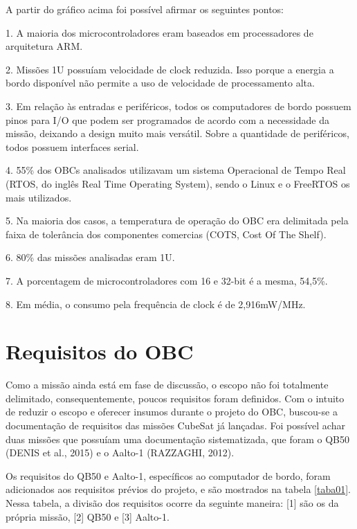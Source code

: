 \begin{apendicesenv}
A partir do gráfico acima foi possível afirmar os seguintes pontos:

1. A maioria dos microcontroladores eram baseados em processadores de arquitetura ARM.

2. Missões 1U possuíam velocidade de clock reduzida. Isso porque a energia a bordo disponível não permite a uso de velocidade de processamento alta.

3. Em relação às entradas e periféricos, todos os computadores de bordo possuem pinos para I/O que podem ser programados de acordo com a necessidade da missão, deixando a design muito mais versátil. Sobre a quantidade de periféricos, todos possuem interfaces serial.

4. 55\% dos OBCs analisados utilizavam um sistema Operacional de Tempo Real (RTOS, do inglês Real Time Operating System), sendo o Linux e o FreeRTOS os mais utilizados. 

5. Na maioria dos casos, a temperatura de operação do OBC era delimitada pela faixa de tolerância dos componentes comercias (COTS, Cost Of The Shelf). 

6. 80\% das missões analisadas eram 1U.

7. A porcentagem de microcontroladores com 16 e 32-bit é a mesma, 54,5\%.

8. Em média, o consumo pela frequência de clock é de 2,916mW/MHz.





\chapter{Requisitos do OBC}
\label{apendiceb}


Como a missão ainda está em fase de discussão, o escopo não foi totalmente delimitado, consequentemente, poucos requisitos foram definidos. Com o intuito de reduzir o escopo e oferecer insumos durante o projeto do OBC, buscou-se a documentação de requisitos das missões CubeSat já lançadas. Foi possível achar duas missões que possuíam uma documentação sistematizada, que foram o QB50 (DENIS et al., 2015) e o Aalto-1 (RAZZAGHI, 2012).

Os requisitos do QB50 e Aalto-1, específicos ao computador de bordo, foram adicionados aos requisitos prévios do projeto, e são mostrados na tabela \ref{taba01}. Nessa tabela,  a divisão dos requisitos ocorre da seguinte maneira: [1] são os da própria missão, [2] QB50 e [3] Aalto-1.


\begin{table}[h]
	\centering
    \caption{Requisitos do OBC.}
    \label{taba01}
\end{table}
\end{apendicesenv}
